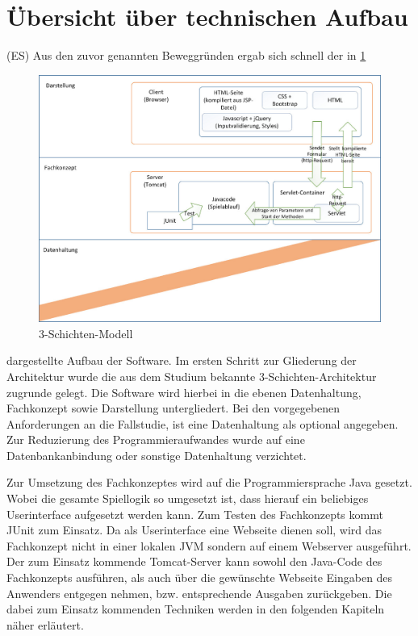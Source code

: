 \section{Übersicht über technischen Aufbau}
(ES) Aus den zuvor genannten Beweggründen ergab sich schnell der in \ref{fig:abb29} 
\begin{figure}[!h]
	\centering
	\includegraphics[scale=0.2]{img/3-schichten-modell.jpeg}
	\caption{3-Schichten-Modell} \label{fig:abb29}
\end{figure}
dargestellte Aufbau der Software. Im ersten Schritt zur Gliederung der Architektur wurde die aus dem Studium bekannte 3-Schichten-Architektur zugrunde gelegt. Die Software wird hierbei in die ebenen Datenhaltung, Fachkonzept sowie Darstellung untergliedert. Bei den vorgegebenen Anforderungen an die Fallstudie, ist eine Datenhaltung als optional angegeben. Zur Reduzierung des Programmieraufwandes wurde auf eine Datenbankanbindung oder sonstige Datenhaltung verzichtet.

Zur Umsetzung des Fachkonzeptes wird auf die Programmiersprache Java gesetzt. Wobei die gesamte Spiellogik so umgesetzt ist, dass hierauf ein beliebiges Userinterface aufgesetzt werden kann. Zum Testen des Fachkonzepts kommt JUnit zum Einsatz. Da als Userinterface eine Webseite dienen soll, wird das Fachkonzept nicht in einer lokalen JVM sondern auf einem Webserver ausgeführt. Der zum Einsatz kommende Tomcat-Server kann sowohl den Java-Code des Fachkonzepts ausführen, als auch über die gewünschte Webseite Eingaben des Anwenders entgegen nehmen, bzw. entsprechende Ausgaben zurückgeben. Die dabei zum Einsatz kommenden Techniken werden in den folgenden Kapiteln näher erläutert.

